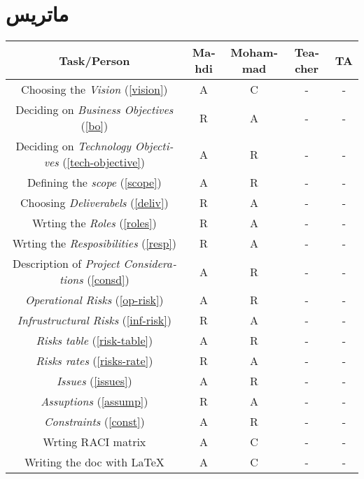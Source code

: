 \chapter{ماتریس }
\begin{table}[H]
\begin{latin}
\begin{adjustbox}{width=\textwidth}
\begin{tabular}{|c|c|c|c|c|}
\hline
Task/Person & Mahdi & Mohammad & Teacher & TA \\
\hline
\hline

Choosing the \textit{Vision} (\ref{vision}) & A & C & - & - \\
\hline

Deciding on \textit{Business Objectives} (\ref{bo}) & R & A & - & - \\
\hline

Deciding on \textit{Technology Objectives} (\ref{tech-objective}) & A & R & - & - \\
\hline

Defining the \textit{scope} (\ref{scope}) & A & R & - & - \\
\hline

Choosing \textit{Deliverabels} (\ref{deliv}) & R & A & - & - \\
\hline

Wrting the \textit{Roles} (\ref{roles}) & R & A & - & - \\
\hline

Wrting the \textit{Resposibilities} (\ref{resp}) & R & A & - & - \\
\hline

Description of \textit{Project Considerations} (\ref{consd}) & A & R & - & - \\
\hline

\textit{Operational Risks} (\ref{op-risk}) & A & R & - & - \\
\hline

\textit{Infrustructural Risks} (\ref{inf-risk}) & R & A & - & - \\
\hline

\textit{Risks table} (\ref{risk-table}) & A & R & - & - \\
\hline

\textit{Risks rates} (\ref{risks-rate}) & R & A & - & - \\
\hline

\textit{Issues} (\ref{issues}) & A & R & - & - \\
\hline

\textit{Assuptions} (\ref{assump}) & R & A & - & - \\
\hline

\textit{Constraints} (\ref{const}) & A & R & - & - \\
\hline

Wrting RACI matrix & A & C & - & - \\
\hline
Writing the doc with \LaTeX & A & C & - & - \\
\hline
\end{tabular}
\end{adjustbox}
\end{latin}
\end{table}
